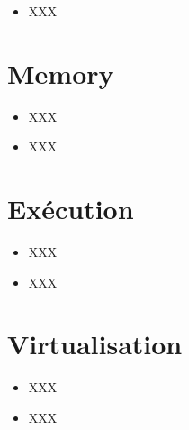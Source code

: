 \begin{correction}

\begin{itemize}
  \item
    XXX
\end{itemize}

\end{correction}

%
%

\section{Memory
         {\hfill{} }}

\begin{itemize}
  \item
    XXX
\end{itemize}

\begin{correction}

\begin{itemize}
  \item
    XXX
\end{itemize}

\end{correction}

%
%

\section{Ex\'ecution
         {\hfill{} }}

\begin{itemize}
  \item
    XXX
\end{itemize}

\begin{correction}

\begin{itemize}
  \item
    XXX
\end{itemize}

\end{correction}

%
%

\section{Virtualisation
         }

\begin{itemize}
  \item
    XXX
\end{itemize}

\begin{correction}

\begin{itemize}
  \item
    XXX
\end{itemize}

\end{correction}
